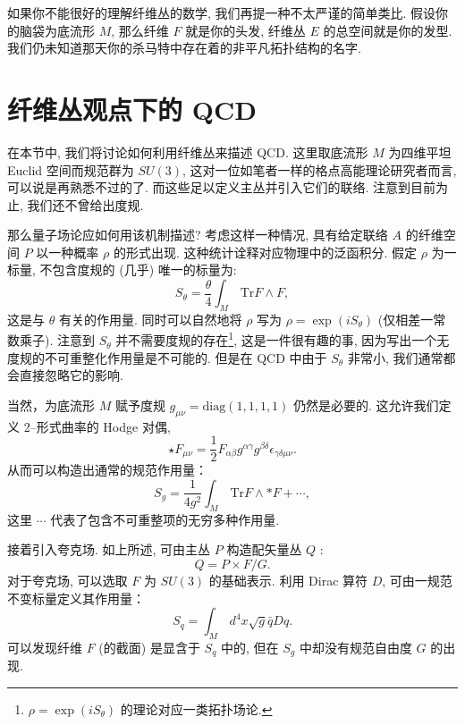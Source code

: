 \documentclass{article}
\begin{document}
\par 如果你不能很好的理解纤维丛的数学, 我们再提一种不太严谨的简单类比. 假设你的脑袋为底流形 $M$, 那么纤维 $F$ 就是你的头发, 纤维丛 $E$ 的总空间就是你的发型. 我们仍未知道那天你的杀马特中存在着的非平凡拓扑结构的名字.
\section{纤维丛观点下的 QCD}
在本节中, 我们将讨论如何利用纤维丛来描述 QCD. 这里取底流形 $M$ 为四维平坦 Euclid 空间而规范群为 $SU(3)$, 这对一位如笔者一样的格点高能理论研究者而言, 可以说是再熟悉不过的了. 而这些足以定义主丛并引入它们的联络. 注意到目前为止, 我们还不曾给出度规.

\par 那么量子场论应如何用该机制描述? 考虑这样一种情况, 具有给定联络 $A$ 的纤维空间 $P$ 以一种概率 $\rho$ 的形式出现. 这种统计诠释对应物理中的泛函积分. 假定 $\rho$ 为一标量, 不包含度规的 (几乎) 唯一的标量为:
\begin{equation}
S_{\theta}=\frac{\theta}{4}\int_{M}\,\textrm{Tr}F\wedge F,
\end{equation}
这是与 $\theta$ 有关的作用量. 同时可以自然地将 $\rho$ 写为 $\rho=\exp(iS_{\theta})$ (仅相差一常数乘子). 注意到
 $S_{\theta}$ 并不需要度规的存在\footnote{$\rho=\exp(iS_{\theta})$ 的理论对应一类拓扑场论.}, 这是一件很有趣的事,
 因为写出一个无度规的不可重整化作用量是不可能的. 但是在 QCD 中由于 $S_{\theta}$ 非常小, 我们通常都会直接忽略它的影响.
\par 当然，为底流形 $M$ 赋予度规 $g_{\mu\nu}=\textrm{diag}(1,1,1,1)$ 仍然是必要的. 这允许我们定义 2--形式曲率的 Hodge 对偶,
\begin{equation}
\star F_{\mu\nu}=\frac{1}{2}F_{\alpha\beta}g^{\alpha\gamma}g^{\beta\delta}\epsilon_{\gamma\delta\mu\nu}.
\end{equation}
从而可以构造出通常的规范作用量：
\begin{equation}
S_{g}=\frac{1}{4g^{2}}\int_{M}\,\textrm{Tr}F\wedge *F+ \cdots,
\end{equation}
这里 $\cdots$ 代表了包含不可重整项的无穷多种作用量.
\par 接着引入夸克场. 如上所述, 可由主丛 $P$ 构造配矢量丛 $Q$ :
\begin{equation}
Q=P\times F/G.
\end{equation}
对于夸克场, 可以选取 $F$ 为 $SU(3)$ 的基础表示. 利用 Dirac 算符 $D$, 可由一规范不变标量定义其作用量：
\begin{equation}
S_{q}=\int_{M}\,d^{4}x\sqrt{g}\bar{q}Dq.
\end{equation}
可以发现纤维 $F$ (的截面) 是显含于 $S_{q}$ 中的, 但在 $S_{g}$ 中却没有规范自由度 $G$ 的出现.
\end{document}
